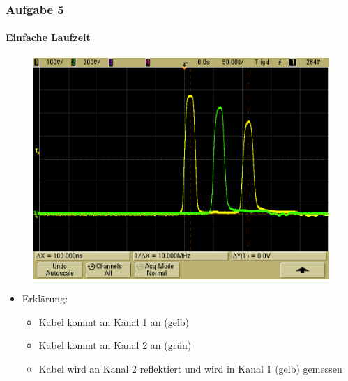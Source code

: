 \begin{frame}
    \frametitle{Aufgabe 5}
    \framesubtitle{Einfache Laufzeit}
    \begin{figure}[H]
    \begin{center}
            \includegraphics[scale=0.2]{./img/5c_zweiter_Kanal.png}
    \end{center}
    \end{figure}
    \begin{itemize}
        \item Erklärung:
        \begin{itemize}
            \item Kabel kommt an Kanal 1 an (gelb)
            \item Kabel kommt an Kanal 2 an (grün)
            \item Kabel wird an Kanal 2 reflektiert und wird in Kanal 1 (gelb)
            gemessen
        \end{itemize}
    \end{itemize}
\end{frame}
